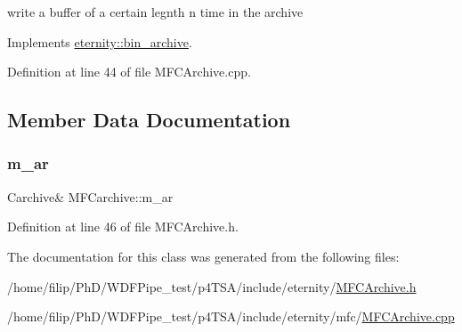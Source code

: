write a buffer of a certain legnth n time in the archive 



Implements \hyperlink{classeternity_1_1bin__archive_acbe041b0815f2721ee18ad042557b14e}{eternity\+::bin\+\_\+archive}.



Definition at line 44 of file M\+F\+C\+Archive.\+cpp.



\subsection{Member Data Documentation}
\mbox{\label{class_m_f_carchive_a57d8f21676284f6004ce3ca11b573c05}} 
\subsubsection{\texorpdfstring{m\+\_\+ar}{m\_ar}}
{\footnotesize\ttfamily Carchive\& M\+F\+Carchive\+::m\+\_\+ar\hspace{0.3cm}{\ttfamily [protected]}}



Definition at line 46 of file M\+F\+C\+Archive.\+h.



The documentation for this class was generated from the following files\+:\begin{DoxyCompactItemize}
\item 
/home/filip/\+Ph\+D/\+W\+D\+F\+Pipe\+\_\+test/p4\+T\+S\+A/include/eternity/\hyperlink{_m_f_c_archive_8h}{M\+F\+C\+Archive.\+h}\item 
/home/filip/\+Ph\+D/\+W\+D\+F\+Pipe\+\_\+test/p4\+T\+S\+A/include/eternity/mfc/\hyperlink{_m_f_c_archive_8cpp}{M\+F\+C\+Archive.\+cpp}\end{DoxyCompactItemize}
